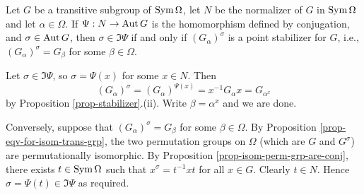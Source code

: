 \begin{theorem} \label{thm-normalizer-of-perm-grp}
	Let $G$ be a transitive subgroup of $\operatorname{Sym}\Omega$, let $N$ be the normalizer of $G$ in $\operatorname{Sym} \Omega$ and let $\alpha \in \Omega$. If $\Psi:N\to \operatorname{Aut} G$ is the homomorphism defined by conjugation, and $\sigma \in \operatorname{Aut} G$, then
	$ \sigma \in \Im  \Psi$ if and only if $(G_\alpha)^\sigma$ is a point stabilizer for $G$, i.e., $(G_\alpha)^\sigma = G_\beta$ for some $\beta\in\Omega$.
\end{theorem}
\begin{sketch}
	Let $\sigma \in\Im  \Psi$, so $\sigma = \Psi(x)$ for some $x \in N$. Then $$(G_\alpha)^\sigma= (G_\alpha)^{\Psi(x)} = x^{-1}G_\alpha x = G_{\alpha^x}$$
	by  Proposition \ref{prop-stabilizer}.(ii). Write $\beta = \alpha^x$ and we are done. 
	
	Conversely, suppose that $(G_\alpha)^\sigma = G_\beta$ for some $\beta \in \Omega$. By Proposition \ref{prop-eqv-for-isom-trans-grp}, the two permutation groups on $\Omega$ (which are $G$ and $G^\sigma$) are permutationally isomorphic. By Proposition \ref{prop-isom-perm-grp-are-conj}, there exists $t \in \operatorname{Sym}\Omega$ such that $x^\sigma = t^{-1}xt$ for all $x \in G$. Clearly $t \in N$. Hence $\sigma = \Psi(t) \in\Im  \Psi$ as required.
\end{sketch}

